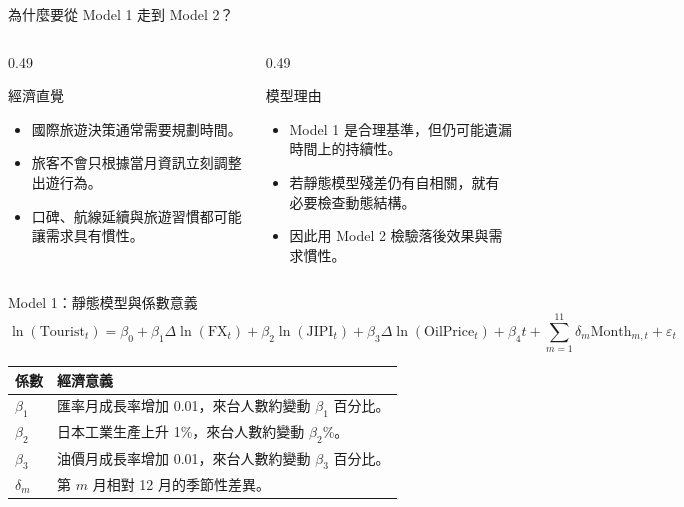 \documentclass[aspectratio=169]{ctexbeamer}
\begin{document}
\begin{frame}{為什麼要從 Model 1 走到 Model 2？}
\begin{columns}[T]
  \begin{column}{0.49\textwidth}
    \begin{block}{經濟直覺}
    \begin{itemize}
      \item 國際旅遊決策通常需要規劃時間。
      \item 旅客不會只根據當月資訊立刻調整出遊行為。
      \item 口碑、航線延續與旅遊習慣都可能讓需求具有慣性。
    \end{itemize}
    \end{block}
  \end{column}
  \begin{column}{0.49\textwidth}
    \begin{block}{模型理由}
    \begin{itemize}
      \item Model 1 是合理基準，但仍可能遺漏時間上的持續性。
      \item 若靜態模型殘差仍有自相關，就有必要檢查動態結構。
      \item 因此用 Model 2 檢驗落後效果與需求慣性。
    \end{itemize}
    \end{block}
  \end{column}
\end{columns}
\end{frame}

\begin{frame}{Model 1：靜態模型與係數意義}
\small
\[
\ln(\mathrm{Tourist}_t)=\beta_0+\beta_1\Delta\ln(\mathrm{FX}_t)+\beta_2\ln(\mathrm{JIPI}_t)+\beta_3\Delta\ln(\mathrm{OilPrice}_t)+\beta_4 t+\sum_{m=1}^{11}\delta_m\mathrm{Month}_{m,t}+\varepsilon_t
\]
\small
\begin{tabularx}{\textwidth}{>{\raggedright\arraybackslash}p{} >{\raggedright\arraybackslash}X}
\toprule
係數 & 經濟意義 \\
\midrule
$\beta_1$ & 匯率月成長率增加 0.01，來台人數約變動 $\beta_1$ 百分比。 \\
$\beta_2$ & 日本工業生產上升 1\%，來台人數約變動 $\beta_2$\%。 \\
$\beta_3$ & 油價月成長率增加 0.01，來台人數約變動 $\beta_3$ 百分比。 \\
$\delta_m$ & 第 $m$ 月相對 12 月的季節性差異。 \\
\bottomrule
\end{tabularx}
\end{frame}
\end{document}
